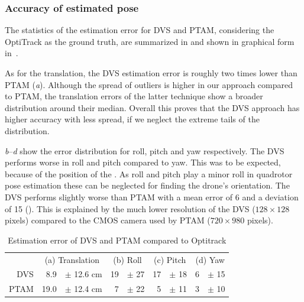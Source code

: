 \subsubsection{Accuracy of estimated pose\label{sec:poseestimationeval}}

The statistics of the estimation error for DVS and PTAM, considering
the OptiTrack as the ground truth, are summarized in 
and shown in graphical form in~.

As for the translation, the DVS estimation error is roughly two times
lower than PTAM (\emph{a}). Although the spread
of outliers is higher in our approach compared to PTAM, the translation
errors of the latter technique show a broader distribution around
their median. Overall this proves that the DVS approach has higher
accuracy with less spread, if we neglect the extreme tails of the
distribution.

\emph{b}--\emph{d} show the error distribution
for roll, pitch and yaw respectively. The DVS performs worse in roll
and pitch compared to yaw. This was to be expected, because of the
position of the \ALMs. As roll and pitch play a minor roll in quadrotor
pose estimation these can be neglected for finding the drone's orientation.
The DVS performs slightly worse than PTAM with a mean error of 6\textdegree{}
and a deviation of 15\textdegree{} ().
This is explained by the much lower resolution of the DVS ($128\times128$
pixels) compared to the CMOS camera used by PTAM ($720\times980$
pixels). 

\begin{table}[H]
\caption{\label{tab:Estimation-error}Estimation error of DVS and PTAM compared
to Optitrack}


\centering

\newcommand{\tmean}{mean\xspace}
\newcommand{\incm}{[cm]}
\newcommand{\indeg}{[$^\circ$]}
\newcommand{\tstd}{std.dev.\xspace}
\renewcommand{\tabcolsep}{3pt}
\footnotesize

\begin{tabular}{r|rl|rl|rl|rl}
\multicolumn{1}{r}{} & \multicolumn{2}{c}{(a) Translation} & \multicolumn{2}{c}{(b) Roll } & \multicolumn{2}{c}{(c) Pitch} & \multicolumn{2}{c}{(d) Yaw}\tabularnewline
\cline{2-9} 
DVS\rule{0pt}{1em} & 8.9  & $\pm$ 12.6 cm  & 19  & $\pm$ 27\textdegree{} & 17  & $\pm$ 18\textdegree{}  & 6  & $\pm$ 15\textdegree{}\tabularnewline
PTAM & 19.0 & $\pm$ 12.4 cm & 7  & $\pm$ 22\textdegree{} & 5  & $\pm$ 11\textdegree{}  & 3  & $\pm$ 10\textdegree{}\tabularnewline
\end{tabular}

\end{table}


